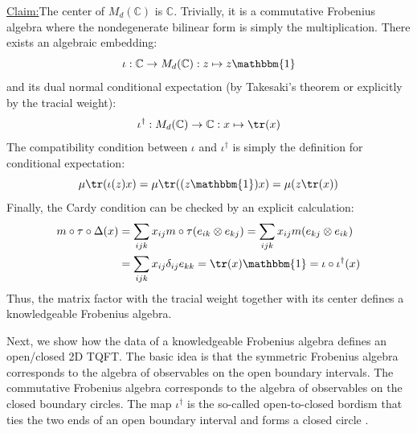 \documentclass[a4paper,11pt]{article}
\theoremstyle{definition}
\numberwithin{equation}{section}
\newenvironment{claim}[1]{\par\noindent\underline{Claim:}\space#1}{}
\begin{document}
\begin{claim}
    The center of $M_d(\mathbb{C})$ is $\mathbb{C}$. Trivially, it is a commutative Frobenius algebra where the nondegenerate bilinear form is simply the multiplication. There exists an algebraic embedding:
    \begin{equation}
        \iota:\mathbb{C}\rightarrow M_d(\mathbb{C}):z\mapsto z \mathbbm{1}
    \end{equation}
    and its dual normal conditional expectation (by Takesaki's theorem or explicitly by the tracial weight):
    \begin{equation}
        \iota^\dagger: M_d(\mathbb{C})\rightarrow \mathbb{C}: x\mapsto \tr(x)
    \end{equation}
    The compatibility condition between $\iota$ and $\iota^\dagger$ is simply the definition for conditional expectation:
    \begin{equation}
        \mu\tr(\iota(z)x) = \mu\tr((z\mathbbm{1})x) = \mu (z\tr(x))
    \end{equation}
    Finally, the Cardy condition can be checked by an explicit calculation:
    \begin{align}
        \begin{split}
            m\circ\tau\circ\Delta(x)&=\sum_{ijk}x_{ij}m\circ\tau(e_{ik}\otimes e_{kj}) = \sum_{ijk}x_{ij}m(e_{kj}\otimes e_{ik}) \\&= \sum_{ijk}x_{ij}\delta_{ij}e_{kk} = \tr(x)\mathbbm{1} = \iota\circ\iota^\dagger(x)
        \end{split}
    \end{align}
    Thus, the matrix factor with the tracial weight together with its center defines a knowledgeable Frobenius algebra. 
\end{claim}

Next, we show how the data of a knowledgeable Frobenius algebra defines an open/closed 2D TQFT. The basic idea is that the symmetric Frobenius algebra corresponds to the algebra of observables on the open boundary intervals. The commutative Frobenius algebra corresponds to the algebra of observables on the closed boundary circles. The map $\iota^\dagger$ is the so-called open-to-closed bordism that ties the two ends of an open boundary interval and forms a closed circle \cite{frobeniusTQFT3}. 
\end{document}
